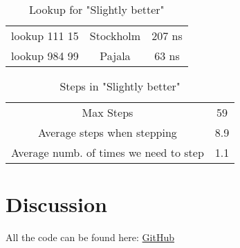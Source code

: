 \documentclass[a4paper,11pt]{article}
\begin{document}
\begin{table}[h!]
    \begin{center}
        \caption{Lookup for "Slightly better"}
        \label{tab:HashTime}
        \begin{tabular}{|c|c|c|}
            \hline
            lookup 111 15 & Stockholm & 207 ns \\
            lookup 984 99 & Pajala    & 63 ns  \\
            \hline
        \end{tabular}
    \end{center}
\end{table}
\begin{table}[h!]
    \begin{center}
        \caption{Steps in "Slightly better"}
        \label{tab:Steps}
        \begin{tabular}{|cc|}
            \hline
            Max Steps                              & 59  \\
            Average steps when stepping            & 8.9 \\
            Average numb. of times we need to step & 1.1 \\
            \hline
        \end{tabular}
    \end{center}
\end{table}

\FloatBarrier
\section{Discussion}


All the code can be found here: \href{https://github.com/adrian-jonsson-sjoedin/ID1021-AlgoData/tree/main/Tasks/Hash/src}{GitHub}
\end{document}
